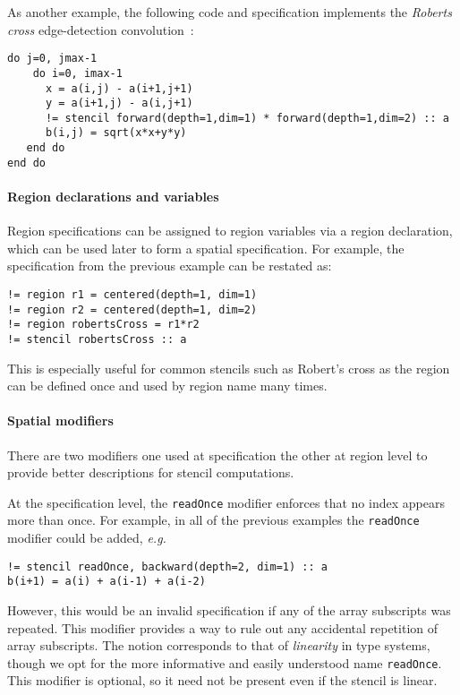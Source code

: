 \documentclass[9pt]{sigplanconf}
\theoremstyle{definition}
\newcommand{\eg}{\emph{e.g.}}
\begin{document}
As another example, the following code and specification
implements the \emph{Roberts cross}
edge-detection convolution~\cite{davis1975survey}:
\begin{verbatim}
do j=0, jmax-1
    do i=0, imax-1
      x = a(i,j) - a(i+1,j+1)
      y = a(i+1,j) - a(i,j+1)
      != stencil forward(depth=1,dim=1) * forward(depth=1,dim=2) :: a
      b(i,j) = sqrt(x*x+y*y)
   end do
end do
\end{verbatim}

\paragraph{Region declarations and variables}

Region specifications can be assigned to region variables via
a region declaration, which can be used later to form a spatial
specification. For example, the specification from the previous
 example can be restated as:
\begin{verbatim}
!= region r1 = centered(depth=1, dim=1)
!= region r2 = centered(depth=1, dim=2)
!= region robertsCross = r1*r2
!= stencil robertsCross :: a
\end{verbatim}
This is especially useful for common stencils such as Robert's cross
as the region can be defined once and used by region name many times.
\paragraph{Spatial modifiers}
There are two modifiers one used at specification the other at region
level to provide better descriptions for stencil computations.

At the specification level, the \texttt{readOnce} modifier enforces that no 
index appears more than once. For example, in all of the previous examples the
\texttt{readOnce} modifier could be added, \eg{}
%
\begin{verbatim}
!= stencil readOnce, backward(depth=2, dim=1) :: a
b(i+1) = a(i) + a(i-1) + a(i-2)
\end{verbatim}
%
However, this would be an invalid specification if any of the
array subscripts was repeated. This modifier provides a way to
rule out any accidental repetition of array subscripts.
The notion corresponds to that of \emph{linearity} in type systems,
though we opt for the more informative and easily understood name
\texttt{readOnce}. This modifier is optional, so it need not
be present even if the stencil is linear.
\end{document}

